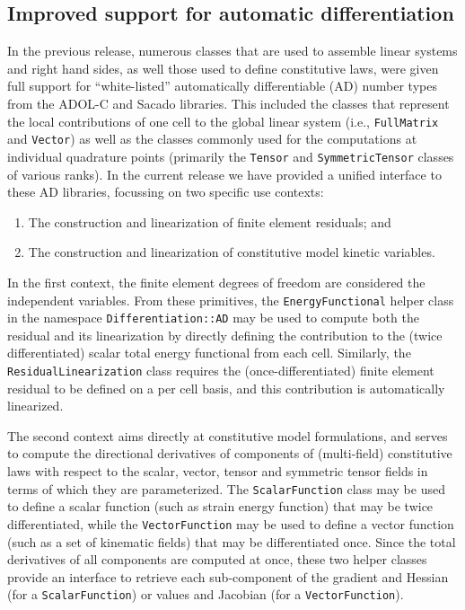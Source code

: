 \documentclass{ansarticle-preprint}
\begin{document}
\subsection{Improved support for automatic differentiation}
\label{subsec:ad}

In the previous release, numerous classes that are used to assemble linear systems
and right hand sides, as well those used to define constitutive laws, were given
full support for ``white-listed'' automatically differentiable (AD) number types
from the ADOL-C and Sacado libraries. This included the classes that
represent the local contributions of one cell to the global linear
system (i.e., \texttt{FullMatrix} and \texttt{Vector}) as well as the
classes commonly used for the computations at individual quadrature
points (primarily the \texttt{Tensor} and \texttt{SymmetricTensor}
classes of various ranks).
In the current release we have provided a unified interface to these
AD libraries, focussing on two specific use contexts:
\begin{enumerate}
\item The construction and linearization of finite element residuals; and
\item The construction and linearization of constitutive model kinetic variables.
\end{enumerate}

In the first context, the finite element degrees of freedom are considered the
independent variables. From these primitives, the \texttt{EnergyFunctional} helper
class in the namespace \texttt{Differentiation::AD} may be used to compute both the
residual and its linearization by directly defining the contribution to the
(twice differentiated) scalar total energy functional from each cell. Similarly,
the \texttt{ResidualLinearization} class requires the (once-differentiated) finite
element residual to be defined on a per cell basis,  and this contribution is
automatically linearized.

The second context aims directly at constitutive model formulations, and serves to
compute the directional derivatives of components of (multi-field) constitutive laws
with respect to the scalar, vector, tensor and symmetric tensor fields in terms
of which they are parameterized. The \texttt{ScalarFunction} class may be used to
define a scalar function (such as strain energy function) that may be twice
differentiated, while the \texttt{VectorFunction} may be used to define a vector
function (such as a set of kinematic fields) that may be differentiated once.
Since the total derivatives of all components are computed at once, these two helper
classes provide an interface to retrieve each sub-component of the gradient and
Hessian (for a \texttt{ScalarFunction}) or values and Jacobian (for a
\texttt{VectorFunction}).
\end{document}
